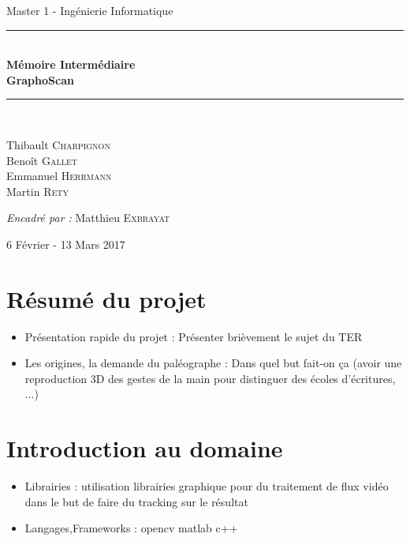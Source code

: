 \documentclass{article}
\begin{document}
\begin{center}
{\large Master 1 - Ingénierie Informatique} \\ [0.5cm]
\vfill
\rule{\linewidth}{0.4mm} \\ [0.4cm]
{\huge \bfseries
Mémoire Intermédiaire 
\\ GraphoScan \\ [0.4cm]
}
\rule{\linewidth}{0.4mm} \\ [1.5cm]

\begin{minipage}{0.4\textwidth}
\begin{flushleft} \large
Thibault \textsc{Charpignon} \\
Benoît \textsc{Gallet} \\
Emmanuel \textsc{Herrmann} \\
Martin \textsc{Rety}
\end{flushleft}
\end{minipage}

\vfill

\large\emph{Encadré par : }{Matthieu \textsc{Exbrayat}}

\vfill


{\large 6 Février - 13 Mars 2017}

\end{center}

\newpage
 
\tableofcontents

\newpage
 
\section{Résumé du projet}
\begin{itemize}
\item Présentation rapide du projet : Présenter brièvement le sujet du TER
\item Les origines, la demande du paléographe : Dans quel but fait-on ça (avoir une reproduction 3D des gestes de la main pour distinguer des écoles d'écritures, ...)
\end{itemize}
\section{Introduction au domaine}
\begin{itemize}
\item Librairies : utilisation librairies graphique pour du traitement de flux vidéo dans le but de faire du tracking sur le résultat
\item Langages,Frameworks : opencv matlab c++
\end{itemize}
\end{document}
